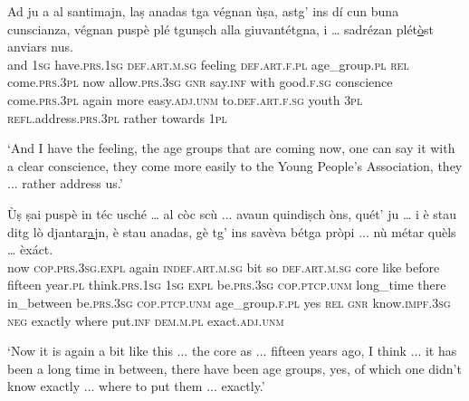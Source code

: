 \begin{linenumbers}
	\gll  Ad ju a al santimajn, laṣ anadas tga végnan ùṣa, astg’ ins dí cun buna cunscianza, végnan puspè plé tgunṣch alla giuvantétgna, i … sadrézan plét\underline{ò}st anviars nus.\\
and \textsc{1sg} have.\textsc{prs.1sg} \textsc{def.art.m.sg} feeling \textsc{def.art.f.pl} age\_group.\textsc{pl} \textsc{rel} come.\textsc{prs.3pl} now allow.\textsc{prs.3sg} \textsc{gnr} say.\textsc{inf} with good.\textsc{f.sg} conscience come.\textsc{prs.3pl} again more easy.\textsc{adj.unm} to.\textsc{def.art.f.sg} youth \textsc{3pl} {} \textsc{refl}.address.\textsc{prs.3pl} rather towards \textsc{1pl}	\\
\end{linenumbers}
\medskip
\glt `And I have the feeling, the age groups that are coming now, one can say it with a clear conscience, they come more easily to the Young People's Association, they ... rather address us.'
\medskip

\begin{linenumbers}
	\gll Ùṣ ṣai puspè in téc usché … al còc scù ... avaun quindiṣch òns, quét’ ju … i è stau ditg lò djantar\underline{a}jn, è stau anadas, gè tg’ ins savèva bétga pròpi ... nù métar quèls … èxáct.\\
	now \textsc{cop.prs.3sg.expl} again \textsc{indef.art.m.sg} bit so {} \textsc{def.art.m.sg} core like {} before fifteen year.\textsc{pl} think.\textsc{prs.1sg} \textsc{1sg} {} \textsc{expl} be.\textsc{prs.3sg} \textsc{cop.ptcp.unm} long\_time there in\_between be.\textsc{prs.3sg} \textsc{cop.ptcp.unm} age\_group.\textsc{f.pl} yes \textsc{rel} \textsc{gnr} know.\textsc{impf.3sg} \textsc{neg} exactly {} where put.\textsc{inf} \textsc{dem.m.pl} {} exact.\textsc{adj.unm} \\
\end{linenumbers}
\medskip
\glt `Now it is again a bit like this ... the core as ... fifteen years ago, I think ... it has been a long time in between, there have been age groups, yes, of which one didn't know exactly ... where to put them ... exactly.'
\medskip

